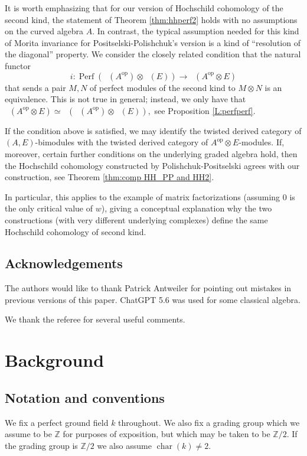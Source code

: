 \documentclass[a4paper]{amsart}
\theoremstyle{plain}
\theoremstyle{definition}
\theoremstyle{remark}
\newcommand{\Z}{\mathbb{Z}}
\DeclareMathOperator{\Perf}{Perf}
\DeclareMathOperator{\PerfII}{Perf^{\mathrm{II}}}
\newcommand{\op}{\mathrm{op}}
\numberwithin{equation}{section}
\theoremstyle{plain}
\begin{document}
	It is worth emphasizing that for our version of Hochschild cohomology of the second kind, the statement of Theorem \ref{thm:hhperf2}  holds with no assumptions on the curved algebra $A$. 
	In contrast, the typical assumption needed for this kind of Morita invariance for Positselski-Polishchuk's version is a kind of ``resolution of the diagonal'' property. We consider the closely related condition  that the natural functor 
	$$
	i \colon \Perf(\PerfII(A^\op)\otimes \PerfII(E))\to  \PerfII(A^\op\otimes E)
	$$
	that sends a pair $M, N$ of perfect modules of the second kind to $M \otimes N$
	is an equivalence.
	This is not true in general; instead, we only have that 
	$	\PerfII(A^\op \otimes E) \simeq \PerfII(\PerfII(A^\op) \otimes \PerfII(E)),$ see Proposition \ref{L:perfperf}. 
	
	If the condition above is satisfied, we may identify the twisted derived category of $(A,E)$-bimodules with the twisted derived category of $A^\op\otimes E$-modules.
	If, moreover, certain further conditions on the underlying graded algebra hold, then the Hochschild cohomology constructed by Polishchuk-Positselski agrees with our construction, see Theorem \ref{thm:comp HH_PP and HH2}.
	
	In particular, this applies to the example of matrix factorizations (assuming 0 is the only critical value of $w$), giving a conceptual explanation why the two constructions (with very different underlying complexes) define the same Hochschild cohomology of second kind.

	
	 
	\subsection{Acknowledgements} The authors would like to thank Patrick Antweiler for pointing out  mistakes in previous versions of this paper. ChatGPT 5.6 was used for some classical algebra.
	
	We thank the referee for several useful comments.
	\section{Background}\label{sect:background}
	\subsection{Notation and conventions}
	We fix a perfect ground field $k$ throughout. We also fix a grading group which we assume to be $\Z$ for purposes of exposition, but which may be taken to be $\Z/2$. If the grading group is $\Z/2$ we also assume $\operatorname{char}(k) \neq 2$.
	
\end{document}
